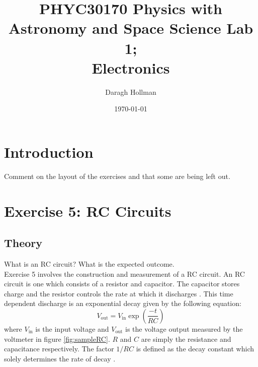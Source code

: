 \documentclass[%
reprint,
amsmath,amssymb,
aps,
floatfix
]{revtex4-2}
\begin{document}
	
	
	\title{PHYC30170 Physics with Astronomy and Space Science Lab 1;\\Electronics}
	
	\author{Daragh Hollman}
	
	\date{\today}
	
	\begin{abstract}
		
	\end{abstract}
	
	\maketitle
	
	\section{Introduction}
		Comment on the layout of the exercises and that some are being left out.
	
	\section{Exercise 5: RC Circuits}
		\subsection{Theory}
		What is an RC circuit? What is the expected outcome.\\
		
		Exercise 5 involves the construction and measurement of a RC circuit. An RC circuit is one which consists of a resistor and capacitor. The capacitor stores charge and the resistor controls the rate at which it discharges \cite{pumplin}. This time dependent discharge is an exponential decay given by the following equation:
		\begin{equation}
			V_\text{out} = V_\text{in} \exp{\left(\frac{-t}{RC}\right)}
			\label{eq:expDecay}
		\end{equation}where $V_\text{in}$ is the input voltage and $V_\text{out}$ is the voltage output measured by the voltmeter in figure \ref{fig:sampleRC}. $R$ and $C$ are simply the resistance and capacitance respectively. The factor $1/RC$ is defined as the decay constant which solely determines the rate of decay \cite{manual}.
		
\end{document}
